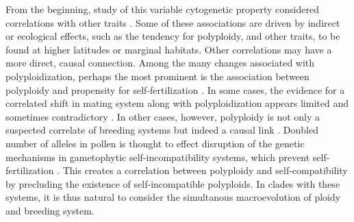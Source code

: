 From the beginning, study of this variable cytogenetic property considered correlations with other traits \citep{stebbins1938}. %
Some of these associations are driven by indirect or ecological effects, such as the tendency for polyploidy, and other traits, to be found at higher latitudes or marginal habitats. %
Other correlations may have a more direct, causal connection.
Among the many changes associated with polyploidization, perhaps the most prominent is the association between polyploidy and propensity for self-fertilization \citep{stebbins1950}. %
In some cases, the evidence for a correlated shift in mating system along with polyploidization appears limited and sometimes contradictory \citep{barringer2007, barrett2008, husband2008}.
In other cases, however, polyploidy is not only a suspected correlate of breeding systems but indeed a causal link \citep{stout1942, lewis1947}.
Doubled number of alleles in pollen is thought to effect disruption of the genetic mechanisms in gametophytic self-incompatibility systems, which prevent self-fertilization \citep{entani1999, tsukamoto2005, kubo2010}. 
This creates a correlation between polyploidy and self-compatibility by precluding the existence of self-incompatible polyploids.
In clades with these systems, it is thus natural to consider the simultanous macroevolution of ploidy and breeding system.

